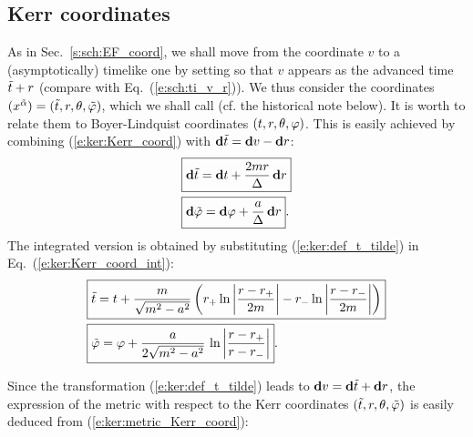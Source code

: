 \subsection{Kerr coordinates} \label{s:ker:3p1_Kerr_coord}

As in Sec.~\ref{s:sch:EF_coord},
we shall move from the coordinate $v$ to a (asymptotically)
timelike one by setting
\be \label{e:ker:def_t_tilde}
     \iff {}
\ee
so that $v$ appears as the advanced time ${\tilde t}+r$ (compare with Eq.~(\ref{e:sch:ti_v_r})). We thus consider
the coordinates $(x^{\tilde{\alpha}}) = ({\tilde t}, r, \theta,{\tilde\varphi})$,
which we shall call
(cf. the historical note below).
It is worth to relate them to Boyer-Lindquist coordinates
$(t,r,\theta,\varphi)$. This is easily achieved
by combining (\ref{e:ker:Kerr_coord}) with $\mathbf{d}{\tilde t} = \mathbf{d} v - \mathbf{d} r$:
\begin{subequations}
\label{e:ker:Kerr_3p1_BL}
\begin{align}
& \fbox{$\displaystyle \mathbf{d} {\tilde t} = \mathbf{d} t + \frac{2m r}{\Delta} \, \mathbf{d} r$} \\
& \fbox{$\displaystyle \mathbf{d} {\tilde\varphi} = \mathbf{d} \varphi + \frac{a}{\Delta}\, \mathbf{d} r$} .
\end{align}
\end{subequations}
The integrated version is obtained by substituting (\ref{e:ker:def_t_tilde}) in
Eq.~(\ref{e:ker:Kerr_coord_int}):
\begin{subequations}
\label{e:ker:Kerr_3p1_BL_int}
\begin{align}
& \fbox{$\displaystyle {\tilde t} = t  + \frac{m}{\sqrt{m^2-a^2}} \left(
    r_+ \ln\left| \frac{r-r_+}{2m} \right|
    - r_- \ln\left| \frac{r-r_-}{2m} \right| \right) $} \label{e:ker:ti_t}\\
& \fbox{$\displaystyle  {\tilde\varphi} = \varphi + \frac{a}{2\sqrt{m^2-a^2}}\, \ln \left|
    \frac{r-r_+}{r-r_-} \right| $} .
\end{align}
\end{subequations}


Since the transformation (\ref{e:ker:def_t_tilde}) leads to $\mathbf{d} v = \mathbf{d}{\tilde t} + \mathbf{d} r$,
the expression of the metric with respect to the
Kerr coordinates $({\tilde t},r,\theta,{\tilde\varphi})$ is easily deduced from
(\ref{e:ker:metric_Kerr_coord}):
\be \label{e:ker:metric_Kerr_3p1}
\ee

